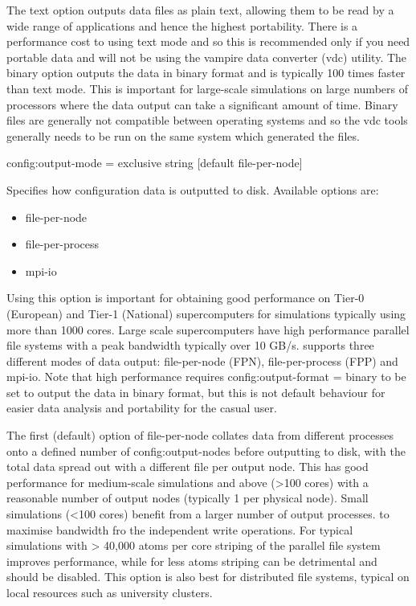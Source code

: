 The text option outputs data files as plain text, allowing them to be read by a wide range of applications and hence the highest portability. There is a performance cost to using text mode and so this is recommended only if you need portable data and will not be using the vampire data converter (vdc) utility. The binary option outputs the data in binary format and is typically 100 times faster than text mode. This is important for large-scale simulations on large numbers of processors where the data output can take a significant amount of time. Binary files are generally not compatible between operating systems and so the vdc tools generally needs to be run on the same system which generated the
files.

{\zicf config:output-mode = exclusive string [default file-per-node]}
Specifies how configuration data is outputted to disk. Available options are:

\begin{itemize}
  \item[] file-per-node
  \item[] file-per-process
  \item[] mpi-io
\end{itemize}

Using this option is important for obtaining good performance on Tier-0 (European) and Tier-1 (National) supercomputers for simulations typically using more than 1000 cores. Large scale supercomputers have high performance parallel file systems with a peak bandwidth typically over 10 GB/s. \vampire supports three different modes of data output: file-per-node (FPN), file-per-process (FPP) and mpi-io. Note that high performance requires
config:output-format = binary to be set to output the data in binary format, but this is not default behaviour for easier data analysis and portability for the casual user.

The first (default) option of file-per-node collates data from different processes onto a defined number of config:output-nodes before
outputting to disk, with the total data spread out with a different file per output node. This has good performance for medium-scale simulations and above (>100 cores) with a reasonable number of output nodes (typically 1 per physical node). Small simulations (<100 cores) benefit from a larger number of output processes. to maximise bandwidth fro the independent write operations. For typical simulations with > 40,000 atoms per core striping of the parallel file system improves performance, while for less atoms striping can be detrimental and should be disabled. This option is also best for distributed file systems, typical on local resources such as university clusters.


